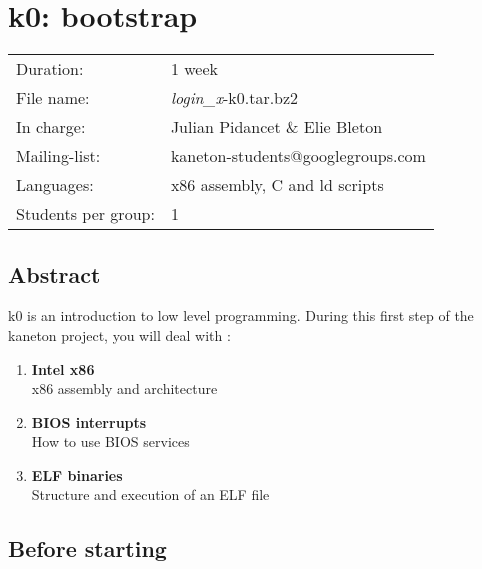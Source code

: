 
%
%

\chapter{k0: bootstrap}

%
%

\begin{tabular}{p{7cm}l}
Duration: & 1 week \\
File name: & {\em login\_x}-k0.tar.bz2 \\
In charge: & Julian Pidancet \& Elie Bleton\\
Mailing-list: & kaneton-students@googlegroups.com \\
Languages: & x86 assembly, C and ld scripts \\
Students per group: & 1 \\
\end{tabular}

\section{Abstract}

k0 is an introduction to low level programming. During this first step of
the kaneton project, you will deal with :

\begin{enumerate}
  \item
    {\bf Intel x86}\\
    x86 assembly and architecture\\
  \item
    {\bf BIOS interrupts}\\
    How to use BIOS services\\
  \item
    {\bf ELF binaries}\\
    Structure and execution of an ELF file\\
\end{enumerate}

\clearpage

\section{Before starting}

